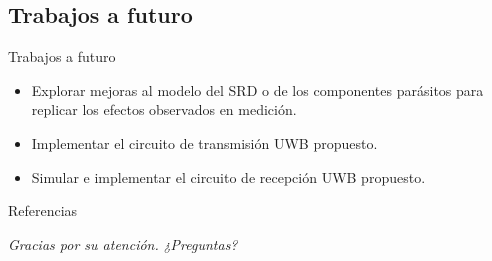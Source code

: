 \documentclass{beamer}
\begin{document}
\subsection{Trabajos a futuro}

\begin{frame}{Trabajos a futuro}
    \begin{itemize}
        \item Explorar mejoras al modelo del SRD o de los componentes parásitos
            para replicar los efectos observados en medición.
        \item Implementar el circuito de transmisión UWB propuesto.
        \item Simular e implementar el circuito de recepción UWB propuesto.
    \end{itemize}
\end{frame}

\begin{frame}[allowframebreaks]{Referencias}
    
    
\end{frame}

\begin{frame}{}
  \centering \Huge
  \emph{Gracias por su atención.}
  \emph{¿Preguntas?}
\end{frame}
\end{document}
